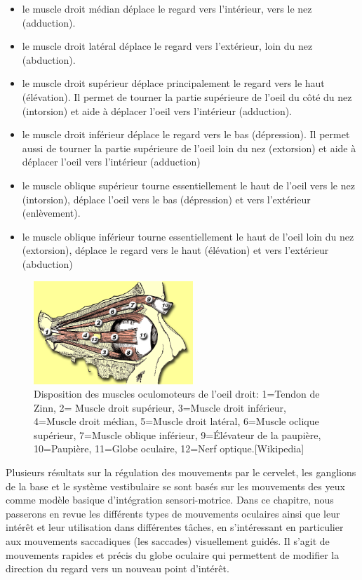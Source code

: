 \begin{itemize}
\item le muscle droit médian déplace le regard vers l'intérieur, vers le nez (adduction).
\item le muscle droit latéral déplace le regard vers l'extérieur, loin du nez (abduction).
\item le muscle droit supérieur déplace principalement le regard vers le haut (élévation). Il permet de tourner la partie supérieure de l'oeil du côté du nez (intorsion) et aide à déplacer l'oeil vers l'intérieur (adduction).
\item le muscle droit inférieur déplace le regard vers le bas (dépression). Il permet aussi de tourner la partie supérieure de l'oeil loin du nez (extorsion) et aide à déplacer l'oeil vers l'intérieur (adduction)
\item le muscle oblique supérieur tourne essentiellement le haut de l'oeil vers le nez (intorsion), déplace l'oeil vers le bas (dépression) et vers l'extérieur (enlèvement).
\item le muscle oblique inférieur tourne essentiellement le haut de l'oeil loin du nez (extorsion), déplace le regard vers le haut (élévation) et vers l'extérieur (abduction)\\
 \end{itemize}

\begin{figure}
\begin{center}
\includegraphics[width=6cm]{figures/ch2_1_oeil}
\end{center}
\caption{ Disposition des muscles oculomoteurs de l'oeil droit: 1=Tendon de Zinn, 2= Muscle droit supérieur, 3=Muscle droit inférieur, 4=Muscle droit médian, 5=Muscle droit latéral, 6=Muscle oclique supérieur, 7=Muscle oblique inférieur, 9=Élévateur de la paupière, 10=Paupière, 11=Globe oculaire, 12=Nerf optique.[Wikipedia]}
\label{oeil}
\end{figure}

Plusieurs résultats sur la régulation des mouvements par le cervelet, les ganglions de la base et le système vestibulaire se sont basés sur les mouvements des yeux \cite{Purves:2005} comme modèle basique d'intégration sensori-motrice. Dans ce chapitre, nous passerons en revue les différents types de mouvements oculaires ainsi que leur intérêt et leur utilisation dans différentes tâches, en s'intéressant en particulier aux mouvements saccadiques (les saccades) visuellement guidés. Il s'agit de mouvements rapides et précis du globe oculaire qui permettent de modifier la direction du regard vers un nouveau point d'intérêt.\\


